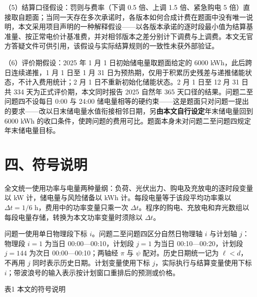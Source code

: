 \documentclass[12pt,a4paper]{ctexart}
\begin{document}
（5）结算口径假设：罚则与费率（下调 0.5 倍、上调 1.5 倍、紧急购电 5 倍）直接取自题面；当同一天存在多次承诺时，各版本如何合成计费在题面中没有唯一说明，本文采用项目声明的一种解释假设——以各版本承诺的逐时段最小值为结算基准量、按正常电价计基准费，并对相邻版本之差分别计下调费与上调费。本文无官方答疑文件可供引用，该假设与实际结算规则的一致性未获外部验证。

（6）评价期假设：2025 年 1 月 1 日初始储电量取题面给定的 6000 kWh，此后跨日连续递推，1 月 1 日至 1 月 31 日为预热期，仅用于积累历史残差与递推储能状态，不计入费用统计；2 月 1 日不重新初始化储能状态。2 月 1 日至 12 月 31 日共 334 天为正式评价期，本文同时报告 2025 自然年 365 天口径的结果。问题二至问题四不设每日 0:00 与 24:00 储电量相等的硬约束——这是题面只对问题一提出的要求——改以日末储电量水值衔接相邻日期，另\textbf{由本文自行设定}年末储电量回到 6000 kWh 的收口条件，使跨问题的费用可比。题面本身未对问题二至问题四规定年末储电量目标。

\section*{四、符号说明}

全文统一使用功率与电量两种量纲：负荷、光伏出力、购电及充放电的逐时段变量以 kW 计，储电量与风险储备以 kWh 计。每段电量等于该段平均功率乘以 $\Delta t=1/6$ h，费用中的功率变量只乘一次 $\Delta t$。程序的购电、充放电和弃光数组以每段电量存储，转换为本文功率变量时须除以 $\Delta t$。

问题一使用单日物理段下标 $i$。问题二至问题四区分自然日物理轴 $i$ 与计划轴 $j$：物理段 $i=1$ 为当日 00:00—00:10，计划段 $j=1$ 为当日 00:10—00:20，计划段 $j=144$ 为次日 00:00—00:10；两轴经 $\pi$ 与 $\psi$ 配对。历史日期统一记为 $\ell<d$，不再用 $j$ 同时表示历史日期。计划变量使用下标 $j$，实际执行与结算变量使用下标 $i$；带波浪号的输入表示按计划窗口重排后的预测或价格。

表1 本文的符号说明
\end{document}
